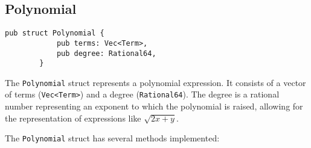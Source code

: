 

\subsection{Polynomial}\label{subsec:polynomial}

\begin{minipage}{\linewidth}
    \begin{lstlisting}[caption={The \texttt{Polynomial} struct}, label={lst:polynomial}]
        pub struct Polynomial {
            pub terms: Vec<Term>,
            pub degree: Rational64,
        }
    \end{lstlisting}
\end{minipage}


The \verb|Polynomial| struct represents a polynomial expression. It consists of a vector of terms (\verb|Vec<Term>|) and a degree (\verb|Rational64|). The degree is a rational number representing an exponent to which the polynomial is raised, allowing for the representation of expressions like $\sqrt{2x + y}$.

The \verb|Polynomial| struct has several methods implemented:

